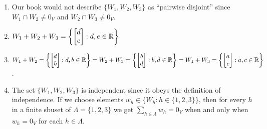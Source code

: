 \smallskip
\begin{solution}
\begin{enumerate} 
  \item Our book would not describe $\{W_1, W_2, W_3\}$ as ``pairwise disjoint'' since $W_1 \cap W_2 \neq 0_V$ and $W_2 \cap W_3 \neq 0_V$.
  \item $W_1 + W_2 + W_3 =  \left\{\begin{bmatrix}  d \\ e\end{bmatrix} : d,e \in \mathbb{R} \right\}$
  \item $W_1 + W_2 = \left\{\begin{bmatrix}  d \\ b\end{bmatrix} : d,b \in \mathbb{R} \right\} = W_2 + W_3 = \left\{\begin{bmatrix}  b \\ d\end{bmatrix} : b,d \in \mathbb{R} \right\} = W_1 + W_3 = \left\{\begin{bmatrix}  a \\ c\end{bmatrix} : a,c \in \mathbb{R} \right\}$.
  \item The set $\{W_1, W_2, W_3\}$ is independent since it obeys the definition of independence. If we choose elements $w_h \in \{W_h : h \in \{1, 2, 3\}\}$, then for every $h$ in a finite sbuset of $\Lambda = \{1, 2, 3\}$ we get $\sum_{h \in \Lambda} w_h = 0_V$ when and only when $w_h = 0_V$ for each $h \in \Lambda$.
\end{enumerate}
\end{solution}

\probskip

